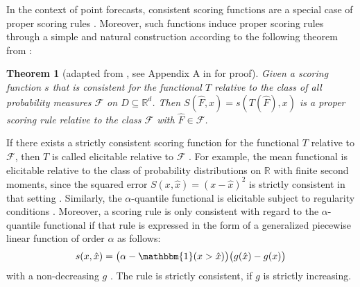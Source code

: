 \documentclass[a4paper,oneside,bibliography=totoc]{scrbook}
\newtheorem{theorem}{Theorem}
\begin{document}
In the context of point forecasts, consistent scoring functions are a special case of proper scoring rules \cite{gneiting_probabilistic_2014}. Moreover, such functions induce proper scoring rules through a simple and natural construction according to the following theorem from \citet{gneiting_making_2011}:
\begin{theorem}[adapted from \citet{gneiting_making_2011}, see Appendix A in \citet{gneiting_making_2011} for proof]
Given a scoring function $s$ that is consistent for the functional $T$ relative to the class of all probability measures $\mathcal{F}$ on $D \subseteq \mathbb{R}^d$. Then $S(\hat{F}, x)=s(T(\hat{F}), x)$ is a proper scoring rule relative to the class $\mathcal{F}$ with $\hat{F} \in \mathcal{F}$.
\end{theorem}
\noindent
If there exists a strictly consistent scoring function for the functional $T$ relative to $\mathcal{F}$, then $T$ is called elicitable relative to $\mathcal{F}$ \cite{lambert_eliciting_2008, osband_information-eliciting_1985, gneiting_probabilistic_2014}.
For example, the mean functional is elicitable relative to the class of probability distributions on $\mathbb{R}$ with finite second moments, since the squared error $S(x, \hat{x}) = (x-\hat{x})^2$ is strictly consistent in that setting \cite{gneiting_probabilistic_2014}.
Similarly, the $\alpha$-quantile functional is elicitable subject to regularity conditions \cite{gneiting_making_2011, gneiting_probabilistic_2014}.
Moreover, a scoring rule is only consistent with regard to the $\alpha$-quantile functional if that rule is expressed in the form of a generalized piecewise linear function of order $\alpha$ as follows:
\begin{equation}
    s(x, \hat{x}) = \big(\alpha - \mathbbm{1}(x>\hat{x})\big)\big(g(\hat{x})-g(x)\big)
    \label{eq:consistent_q}
\end{equation}
with a non-decreasing $g$ \cite{gneiting_making_2011, thomson_eliciting_1979}.
The rule is strictly consistent, if $g$ is strictly increasing.
\end{document}
